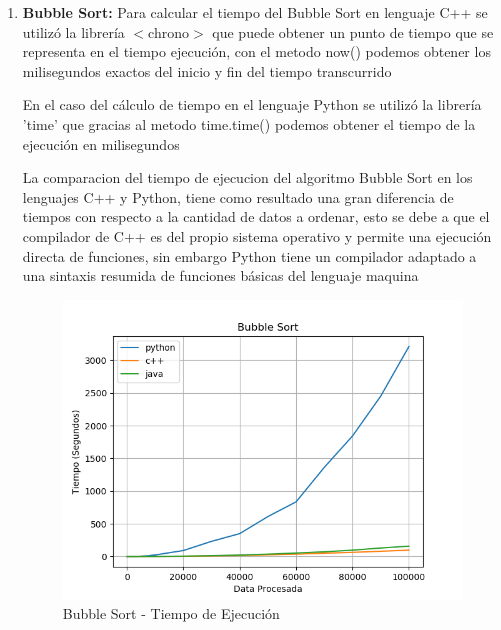 \documentclass{article}
\begin{document}
		            \begin{enumerate}
		                \item \textbf{Bubble Sort: }
		                    Para calcular el tiempo del Bubble Sort en lenguaje C++ se utilizó la librería 
		                    $<$chrono$>$ que puede obtener un punto de tiempo que se representa en el tiempo ejecución, con el metodo now() podemos obtener los milisegundos exactos del inicio y fin del tiempo transcurrido
		                    
		                    
		                
		                    En el caso del cálculo de tiempo en el lenguaje Python se utilizó la librería 'time' que gracias al metodo time.time() podemos obtener el tiempo de la ejecución en milisegundos
		                    
		                    
		                    
		                    La comparacion del tiempo de ejecucion del algoritmo Bubble Sort en los lenguajes C++ y Python, tiene como resultado una gran diferencia de tiempos con respecto a la cantidad de datos a ordenar, esto se debe a que el compilador de C++ es del propio sistema operativo y permite una ejecución directa de funciones, sin embargo Python tiene un compilador adaptado a una sintaxis resumida de funciones básicas del lenguaje maquina
		                    
		                    \begin{figure}[H]
                				\centering
                				\includegraphics[scale=0.60]{img/bubble_sort_grafica.png}
                				\caption{Bubble Sort - Tiempo de Ejecución}
                				\label{fig:bubble_sort_grafica}
                			\end{figure}
		                    

\end{enumerate}
\end{document}
